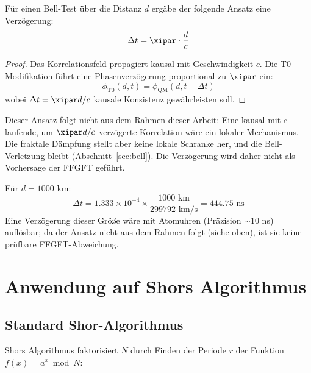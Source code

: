 \begin{proposition}
	Für einen Bell-Test über die Distanz $d$ ergäbe der folgende Ansatz eine Verzögerung:
	\begin{equation}
		\Delta t = \xipar \cdot \frac{d}{c}
		\label{eq:spatial_delay}
	\end{equation}
\end{proposition}

\begin{proof}
	Das Korrelationsfeld propagiert kausal mit Geschwindigkeit $c$. Die T0-Modifikation führt eine Phasenverzögerung proportional zu $\xipar$ ein:
	\begin{equation}
		\phi_{\text{T0}}(d, t) = \phi_{\text{QM}}(d, t - \Delta t)
	\end{equation}
	wobei $\Delta t = \xipar d/c$ kausale Konsistenz gewährleisten soll.
\end{proof}

Dieser Ansatz folgt nicht aus dem Rahmen dieser Arbeit: Eine kausal mit $c$ laufende, um $\xipar d/c$ verzögerte Korrelation wäre ein lokaler Mechanismus. Die fraktale Dämpfung stellt aber keine lokale Schranke her, und die Bell-Verletzung bleibt (Abschnitt~\ref{sec:bell}). Die Verzögerung wird daher nicht als Vorhersage der FFGFT geführt.

\begin{experimentbox}[Satellitentest]
	Für $d = 1000$ km:
	\begin{equation}
		\Delta t = 1.333 \times 10^{-4} \times \frac{1000 \text{ km}}{299792 \text{ km/s}} = 444.75 \text{ ns}
	\end{equation}
	Eine Verzögerung dieser Größe wäre mit Atomuhren (Präzision $\sim 10$ ns) auflösbar; da der Ansatz nicht aus dem Rahmen folgt (siehe oben), ist sie keine prüfbare FFGFT-Abweichung.
\end{experimentbox}

\section{Anwendung auf Shors Algorithmus}
\label{sec:shor}

\subsection{Standard Shor-Algorithmus}

Shors Algorithmus faktorisiert $N$ durch Finden der Periode $r$ der Funktion $f(x) = a^x \bmod N$:

